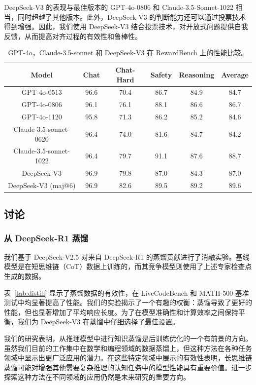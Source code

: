 \documentclass[lang=cn,a4paper,newtx]{elegantpaper}
\newcommand{\dsviii}{DeepSeek-V3}
\begin{document}
\dsviii{} 的表现与最佳版本的 GPT-4o-0806 和 Claude-3.5-Sonnet-1022 相当，同时超越了其他版本。此外，\dsviii{} 的判断能力还可以通过投票技术得到增强。因此，我们使用 \dsviii{} 结合投票技术，对开放式问题提供自我反馈，从而提高对齐过程的有效性和鲁棒性。

\begin{table}[t]
    \centering
    \begin{tabular}{c | c c c c c}
    \toprule
    \textbf{Model} & \textbf{Chat} & \textbf{Chat-Hard} & \textbf{Safety} & \textbf{Reasoning} & \textbf{Average} \\
    \midrule
    GPT-4o-0513 & 96.6 & 70.4 & 86.7 & 84.9 & 84.7\\
    GPT-4o-0806 & 96.1 & 76.1 & 88.1 & 86.6 & 86.7\\
    GPT-4o-1120 & 95.8 & 71.3 & 86.2 & 85.2 & 84.6\\
    \midrule 
    Claude-3.5-sonnet-0620 & 96.4 & 74.0 & 81.6 & 84.7 & 84.2\\
    Claude-3.5-sonnet-1022 & 96.4 & 79.7 & 91.1 & 87.6 & 88.7\\
    \midrule 
    \dsviii{} & 96.9 & 79.8 & 87.0 & 84.3 & 87.0\\
    \dsviii{} (maj@6) & 96.9 & 82.6 & 89.5 & 89.2 & 89.6\\
    \bottomrule
    \end{tabular}
    \caption{GPT-4o，Claude-3.5-sonnet 和 \dsviii{} 在 RewardBench 上的性能比较。}
    \label{tab:rewardbench}
\end{table}

\subsection{讨论}

\subsubsection{从 DeepSeek-R1 蒸馏}

我们基于 DeepSeek-V2.5 对来自 DeepSeek-R1 的蒸馏贡献进行了消融实验。基线模型是在短思维链（CoT）数据上训练的，而其竞争模型则使用了上述专家检查点生成的数据。

表~\ref{tab:distill} 显示了蒸馏数据的有效性，在 LiveCodeBench 和 MATH-500 基准测试中均显著提高了性能。我们的实验揭示了一个有趣的权衡：蒸馏导致了更好的性能，但也显著增加了平均响应长度。为了在模型准确性和计算效率之间保持平衡，我们为 \dsviii{} 在蒸馏中仔细选择了最佳设置。

我们的研究表明，从推理模型中进行知识蒸馏是后训练优化的一个有前景的方向。虽然我们目前的工作集中在数学和编程领域的数据蒸馏上，但这种方法在各种任务领域中显示出更广泛应用的潜力。在这些特定领域中展示的有效性表明，长思维链蒸馏可能对增强其他需要复杂推理的认知任务中的模型性能具有重要价值。进一步探索这种方法在不同领域的应用仍然是未来研究的重要方向。
\end{document}
